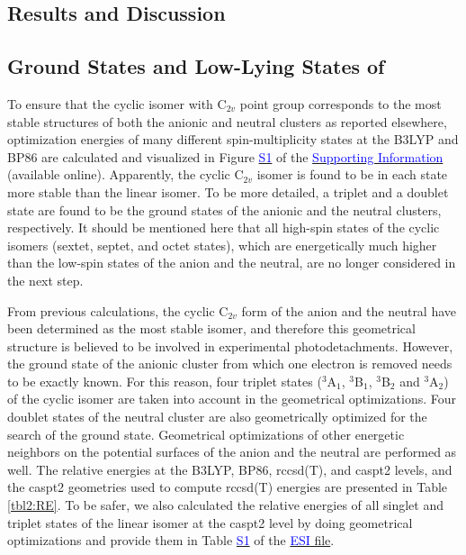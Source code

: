 \begin{refsection}
\section{Results and Discussion}


\subsection{Ground States and Low-Lying States of }

To ensure that the cyclic isomer with C$_{2v}$ point group corresponds to the most stable structures of both the anionic and neutral clusters as reported elsewhere,\cite{c3:9, c3:14, c3:16} optimization energies of many different spin-multiplicity states at the B3LYP and BP86 are calculated and visualized in Figure \href{https://pubs.acs.org/doi/suppl/10.1021/acs.jpca.6b09067/suppl_file/jp6b09067_si_001.pdf}{\textcolor{blue}{S1}} of the \href{https://pubs.acs.org/doi/suppl/10.1021/acs.jpca.6b09067/suppl_file/jp6b09067_si_001.pdf}{\textcolor{blue}{Supporting Information}} (available online). Apparently, the cyclic C$_{2v}$ isomer is found to be in each state more stable than the linear isomer. To be more detailed, a triplet and a doublet state are found to be the ground states of the anionic and the neutral clusters, respectively. It should be mentioned here that all high-spin states of the cyclic isomers (sextet, septet, and octet states), which are energetically much higher than the low-spin states of the anion and the neutral, are no longer considered in the next step. 




From previous calculations, the cyclic C$_{2v}$ form of the anion and the neutral have been determined as the most stable isomer, and therefore this geometrical structure is believed to be involved in experimental photodetachments. However, the ground state of the anionic cluster from which one electron is removed needs to be exactly known. For this reason, four triplet states ($^3$A$_1$, $^3$B$_1$, $^3$B$_2$ and $^3$A$_2$) of the cyclic isomer are taken into account in the geometrical optimizations. Four doublet states of the neutral cluster are also geometrically optimized for the search of the ground state. Geometrical optimizations of other energetic neighbors on the potential surfaces of the anion and the neutral are performed as well. The relative energies at the B3LYP, BP86, \acrshort{rccsd}(T), and \acrshort{caspt2} levels, and the \acrshort{caspt2} geometries used to compute \acrshort{rccsd}(T) energies are presented in Table \ref{tbl2:RE}. To be safer, we also calculated the relative energies of all singlet and triplet states of the linear isomer at the \acrshort{caspt2} level by doing geometrical optimizations and provide them in Table \href{https://pubs.acs.org/doi/suppl/10.1021/acs.jpca.6b09067/suppl_file/jp6b09067_si_001.pdf}{\textcolor{blue}{S1}} of the \href{https://pubs.acs.org/doi/suppl/10.1021/acs.jpca.6b09067/suppl_file/jp6b09067_si_001.pdf}{\textcolor{blue}{ESI} file}.





\end{refsection}
